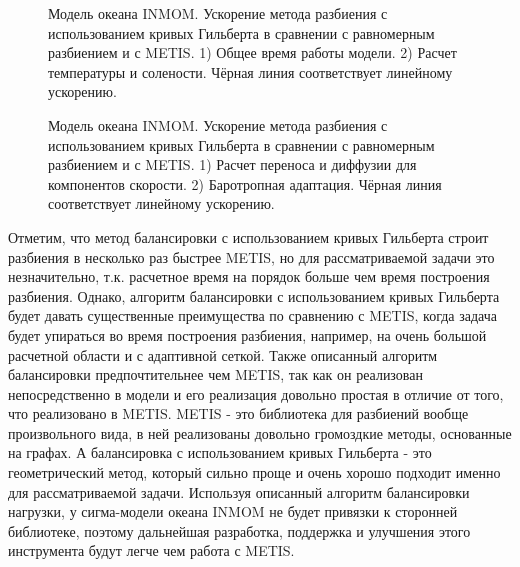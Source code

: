 	\begin{figure}[htb!]
    \begin{minipage}[h]{0.48\linewidth}
    \end{minipage}
    \hfill
    \begin{minipage}[h]{0.48\linewidth}
    \end{minipage}
    \caption{Модель океана INMOM. Ускорение метода разбиения с использованием кривых Гильберта в сравнении с равномерным разбиением и с METIS. 1) Общее время работы модели. 2) Расчет температуры и солености. 
    Чёрная линия соответствует линейному ускорению.}
    \label{fig:inmom_hilbert1}
    \end{figure}
    
     \begin{figure}[htb!]
    \begin{minipage}[h]{0.48\linewidth}
    \end{minipage}
    \hfill
    \begin{minipage}[h]{0.48\linewidth}
    \end{minipage}
    \caption{Модель океана INMOM. Ускорение метода разбиения с использованием кривых Гильберта в сравнении с равномерным разбиением и с METIS. 1) Расчет переноса и диффузии для компонентов скорости. 2) Баротропная адаптация. 
    Чёрная линия соответствует линейному ускорению.}
    \label{fig:inmom_hilbert2}
    \end{figure}


    Отметим, что метод балансировки с использованием кривых Гильберта строит разбиения в несколько раз быстрее METIS, 
    но для рассматриваемой задачи это незначительно, т.к. расчетное время на порядок больше чем время построения разбиения. 
    Однако, алгоритм балансировки с использованием кривых Гильберта будет давать существенные преимущества по сравнению с METIS, когда задача будет упираться во время построения разбиения, 
    например, на очень большой расчетной области и с адаптивной сеткой.
    Также описанный алгоритм балансировки предпочтительнее чем METIS, так как он реализован непосредственно в модели
    и его реализация довольно простая в отличие от того, что реализовано в METIS.
    METIS - это библиотека для разбиений вообще произвольного вида, в ней реализованы довольно громоздкие методы, основанные на графах.
    А балансировка с использованием кривых Гильберта - это геометрический метод, который сильно проще и очень хорошо подходит именно для рассматриваемой задачи.  
    Используя описанный алгоритм балансировки нагрузки, у сигма-модели океана INMOM не будет привязки к сторонней библиотеке,
    поэтому дальнейшая разработка, поддержка и улучшения этого инструмента будут легче чем работа с METIS.
    

